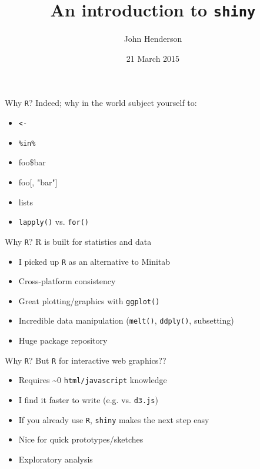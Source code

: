 \documentclass[sans,aspectratio=169,presentation,bigger,fleqn]{beamer}
\author{John Henderson}
\date{21 March 2015}
\title{An introduction to \texttt{shiny}}
\begin{document}
\maketitle

\begin{frame}[fragile,label=sec-1]{Why \texttt{R}?}
 Indeed; why in the world subject yourself to:
\begin{itemize}
\item \texttt{<-}
\item \texttt{\%in\%}
\item foo\$bar
\item foo[, "bar"]
\item lists
\item \texttt{lapply()} vs. \texttt{for()}
\end{itemize}
\end{frame}

\begin{frame}[fragile,label=sec-2]{Why \texttt{R}?}
 R is built for statistics and data
\begin{itemize}
\item I picked up \texttt{R} as an alternative to Minitab
\item Cross-platform consistency
\item Great plotting/graphics with \texttt{ggplot()}
\item Incredible data manipulation (\texttt{melt()}, \texttt{ddply()}, subsetting)
\item Huge package repository
\end{itemize}
\end{frame}

\begin{frame}[fragile,label=sec-3]{Why \texttt{R}?}
 But \texttt{R} for interactive web graphics??

\begin{itemize}
\item Requires \textasciitilde{}0 \texttt{html/javascript} knowledge
\item I find it faster to write (e.g. vs. \texttt{d3.js})
\item If you already use \texttt{R}, \texttt{shiny} makes the next step easy
\item Nice for quick prototypes/sketches
\item Exploratory analysis
\end{itemize}
\end{frame}
\end{document}
